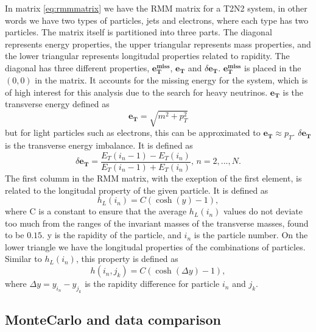 In matrix \ref{eq:rmmmatrix} we have the RMM matrix for a T2N2 system, in other words we have two types of particles, jets and electrons, where each type has
two particles. The matrix itself is partitioned into three parts. The diagonal represents energy properties, the upper triangular represents mass properties, 
and the lower triangular represents longitudal properties related to rapidity. The diagonal has three different properties, $\boldsymbol{e_T^{miss}}$, $\boldsymbol{e_T}$ and $\delta\boldsymbol{e_T}$. 
$\boldsymbol{e_T^{miss}}$ is placed in the $(0,0)$ in the matrix. It accounts for the missing energy for the system, which is of high interest for this analysis due to
the search for heavy neutrinos. $\boldsymbol{e_T}$ is the transverse energy defined as 
\begin{equation*}
    \boldsymbol{e_T} = \sqrt{m^2 + p_T^2}
\end{equation*}
but for light particles such as electrons, this can be approximated to $\boldsymbol{e_T} \approx p_T$. $\delta\boldsymbol{e_T}$ is the transverse energy imbalance.
It is defined as 
\begin{equation*}
    \delta\boldsymbol{e_T} = \frac{E_T(i_n-1) - E_T(i_n)}{E_T(i_n-1) + E_T(i_n)}, \, n = 2, ..., N.
\end{equation*}
The first columm in the RMM matrix, with the exeption of the first element, is related to the longitudal property of the given particle. 
It is defined as
\begin{equation*}
    h_L(i_n) = C(\cosh{(y)} - 1),
\end{equation*}
where C is a constant to ensure that the average $h_L(i_n)$ values do not deviate too much from the ranges of the invariant masses of the transverse masses, found to be $0.15$\cite{Chekanov_2019}. 
y is the rapidity of the particle, and $i_n$ is the particle number. On the lower triangle we have the longitudal properties of the combinations of particles. Similar to $h_L(i_n)$,
this property is defined as 
\begin{equation*}
    h(i_n, j_k) = C(\cosh{(\Delta y)} - 1),
\end{equation*}
where $\Delta y = y_{i_n} - y_{j_k}$ is the rapidity difference for particle $i_n$ and $j_k$.


\subsection*{MonteCarlo and data comparison}\label{sec:mcdatacomp}

